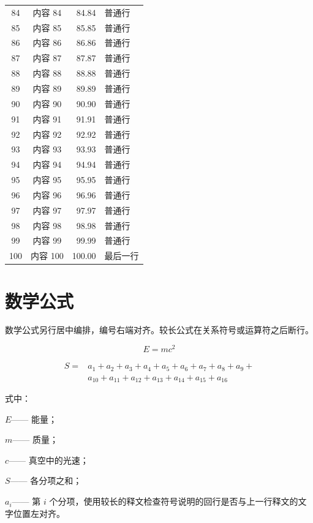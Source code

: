 {\begin{longtable}{!{\vrule width 1pt}c|c|r|p{25mm}!{\vrule width 1pt}}
    84 & 内容 84 & 84.84 & 普通行 \\
    85 & 内容 85 & 85.85 & 普通行 \\
    86 & 内容 86 & 86.86 & 普通行 \\
    87 & 内容 87 & 87.87 & 普通行 \\
    88 & 内容 88 & 88.88 & 普通行 \\
    89 & 内容 89 & 89.89 & 普通行 \\
    90 & 内容 90 & 90.90 & 普通行 \\
    91 & 内容 91 & 91.91 & 普通行 \\
    92 & 内容 92 & 92.92 & 普通行 \\
    93 & 内容 93 & 93.93 & 普通行 \\
    94 & 内容 94 & 94.94 & 普通行 \\
    95 & 内容 95 & 95.95 & 普通行 \\
    96 & 内容 96 & 96.96 & 普通行 \\
    97 & 内容 97 & 97.97 & 普通行 \\
    98 & 内容 98 & 98.98 & 普通行 \\
    99 & 内容 99 & 99.99 & 普通行 \\
    100 & 内容 100 & 100.00 & 最后一行 \\
\end{longtable}
}

\section{数学公式}
数学公式另行居中编排，编号右端对齐。较长公式在关系符号或运算符之后断行。

\begin{equation}
    E = mc^2
    \label{eq:energy}
\end{equation}

\begin{equation}
    \begin{aligned}
        S ={}& a_1 + a_2 + a_3 + a_4 + a_5 + a_6 + a_7 + a_8 + a_9 +{}\\
             &a_{10} + a_{11} + a_{12} + a_{13} + a_{14} + a_{15} + a_{16}
    \end{aligned}
    \label{eq:long}
\end{equation}

式中：

\begin{stdsymbols}
    \item[$E$——] 能量；
    \item[$m$——] 质量；
    \item[$c$——] 真空中的光速；
    \item[$S$——] 各分项之和；
    \item[$a_i$——] 第 $i$ 个分项，使用较长的释文检查符号说明的回行是否与上一行释文的文字位置左对齐。
\end{stdsymbols}

